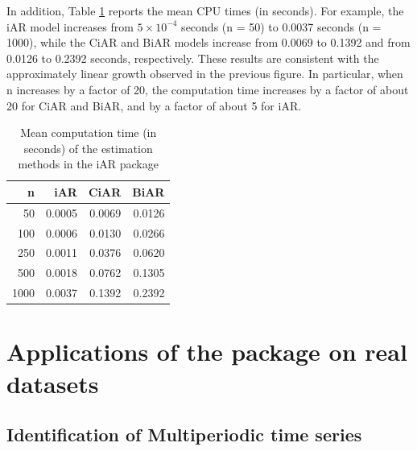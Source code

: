 In addition, Table \ref{tab:timestable} reports the mean CPU times (in seconds). For example, the iAR model increases from \ensuremath{5\times 10^{-4}} seconds (n = 50) to 0.0037 seconds (n = 1000), while the CiAR and BiAR models increase from 0.0069 to 0.1392 and from 0.0126 to 0.2392 seconds, respectively. These results are consistent with the approximately linear growth observed in the previous figure. In particular, when n increases by a factor of 20, the computation time increases by a factor of about 20 for CiAR and BiAR, and by a factor of about 5 for iAR.

\begin{table}

\caption{\label{tab:timestable}Mean computation time (in seconds) of the estimation methods in the iAR package}
\centering
\begin{tabular}[t]{r|r|r|r}
\hline
n & iAR & CiAR & BiAR\\
\hline
50 & 0.0005 & 0.0069 & 0.0126\\
\hline
100 & 0.0006 & 0.0130 & 0.0266\\
\hline
250 & 0.0011 & 0.0376 & 0.0620\\
\hline
500 & 0.0018 & 0.0762 & 0.1305\\
\hline
1000 & 0.0037 & 0.1392 & 0.2392\\
\hline
\end{tabular}
\end{table}

\section{\texorpdfstring{Applications of the  package on real datasets}{Applications of the  package on real datasets}}\label{sec:applications}

\subsection{Identification of Multiperiodic time series}\label{identification-of-multiperiodic-time-series}

